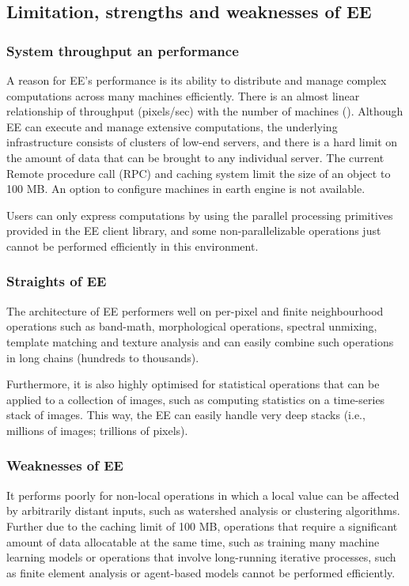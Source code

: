 \subsection{Limitation, strengths and weaknesses of EE}

\subsubsection{System throughput an performance}

A reason for EE's performance is its ability to distribute and manage complex computations across many machines efficiently. There is an almost linear relationship of throughput (pixels/sec) with the number of machines (\cite{gorelick2017google}).
Although EE can execute and manage extensive computations, the underlying infrastructure consists of clusters of low-end servers, and there is a hard limit on the amount of data that can be brought to any individual server. The current Remote procedure call (RPC) and caching system limit the size of an object to 100 MB. An option to configure machines in earth engine is not available.

Users can only express computations by using the parallel processing primitives provided in the EE client library, and some non-parallelizable operations just cannot be performed efficiently in this environment.

\subsubsection{Straights of EE}

The architecture of EE performers well on per-pixel and finite neighbourhood operations such as band-math, morphological operations, spectral unmixing, template matching and texture analysis and can easily combine such operations in long chains (hundreds to thousands). 

Furthermore, it is also highly optimised for statistical operations
that can be applied to a collection of images, such as computing statistics on a time-series stack of images. This way, the EE can easily handle very deep stacks (i.e., millions of images; trillions of pixels). 

\subsubsection{Weaknesses of EE}

It performs poorly for non-local operations in which a local value can be affected by arbitrarily distant inputs, such as watershed analysis or clustering algorithms. Further due to the caching limit of 100 MB, operations that require a significant amount of data allocatable at the same time, such as training many machine learning models or operations that involve long-running iterative processes, such as finite element analysis or agent-based models cannot be performed efficiently. 

